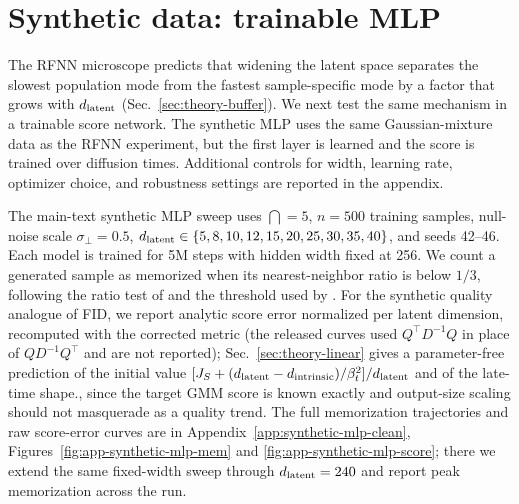 \FloatBarrier

\section{Synthetic data: trainable MLP}
\label{sec:mlp}

The RFNN microscope predicts that widening the latent space separates the slowest population mode from the fastest sample-specific mode by a factor that grows with $d_{\mathrm{latent}}$ (Sec.~\ref{sec:theory-buffer}). We next test the same mechanism in a trainable score network. The synthetic MLP uses the same Gaussian-mixture data as the RFNN experiment, but the first layer is learned and the score is trained over diffusion times. Additional controls for width, learning rate, optimizer choice, and robustness settings are reported in the appendix.

The main-text synthetic MLP sweep uses $\dint=5$, $n=500$ training samples, null-noise scale $\sigma_\perp=0.5$, $d_{\mathrm{latent}}\in \{5,8,10,12,15,20,25,30,35,40\}$, and seeds 42--46. Each model is trained for 5M steps with hidden width fixed at 256. We count a generated sample as memorized when its nearest-neighbor ratio is below $1/3$, following the ratio test of \citet{somepalli2023diffusion} and the threshold used by \citet{bonnaire2025}. For the synthetic quality analogue of FID, we report analytic score error normalized per latent dimension, recomputed with the corrected metric (the released curves used $Q^\top D^{-1}Q$ in place of $QD^{-1}Q^\top$ and are not reported); Sec.~\ref{sec:theory-linear} gives a parameter-free prediction of the initial value $[J_S+(d_{\mathrm{latent}}-d_{\mathrm{intrinsic}})/\beta_t^2]/d_{\mathrm{latent}}$ and of the late-time shape., since the target GMM score is known exactly and output-size scaling should not masquerade as a quality trend. The full memorization trajectories and raw score-error curves are in Appendix~\ref{app:synthetic-mlp-clean}, Figures~\ref{fig:app-synthetic-mlp-mem} and \ref{fig:app-synthetic-mlp-score}; there we extend the same fixed-width sweep through $d_{\mathrm{latent}}=240$ and report peak memorization across the run.

